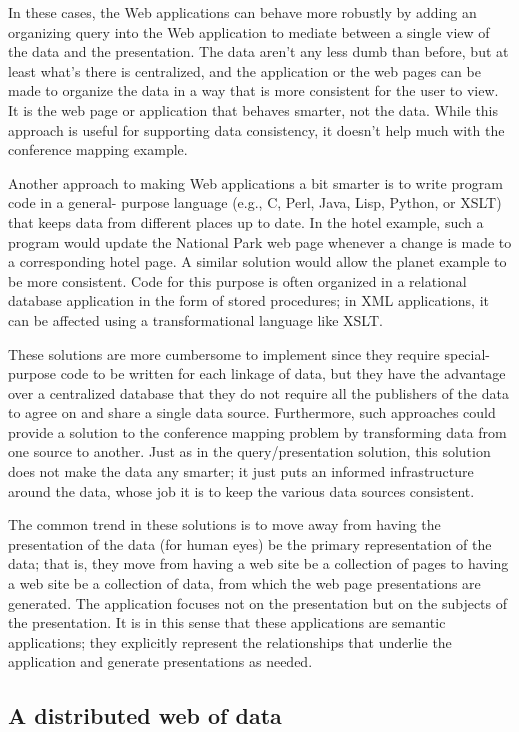 In these cases, the Web applications can behave more robustly by adding
an organizing query into the Web application to mediate between a single
view of the data and the presentation. The data aren't any less dumb
than before, but at least what's there is centralized, and the
application or the web pages can be made to organize the data in a way
that is more consistent for the user to view. It is the web page or
application that behaves smarter, not the data. While this approach is
useful for supporting data consistency, it doesn't help much with the
conference mapping example.

Another approach to making Web applications a bit smarter is to write
program code in a general- purpose language (e.g., C, Perl, Java, Lisp,
Python, or XSLT) that keeps data from different places up to date. In
the hotel example, such a program would update the National Park web
page whenever a change is made to a corresponding hotel page. A similar
solution would allow the planet example to be more consistent. Code for
this purpose is often organized in a relational database application in
the form of stored procedures; in XML applications, it can be affected
using a transformational language like XSLT.

These solutions are more cumbersome to implement since they require
special-purpose code to be written for each linkage of data, but they
have the advantage over a centralized database that they do not require
all the publishers of the data to agree on and share a single data
source. Furthermore, such approaches could provide a solution to the
conference mapping problem by transforming data from one source to
another. Just as in the query/presentation solution, this solution does
not make the data any smarter; it just puts an informed infrastructure
around the data, whose job it is to keep the various data sources
consistent.

The common trend in these solutions is to move away from having the
presentation of the data (for human eyes) be the primary representation
of the data; that is, they move from having a web site be a collection
of pages to having a web site be a collection of data, from which the
web page presentations are generated. The application focuses not on the
presentation but on the subjects of the presentation. It is in this
sense that these applications are semantic applications; they explicitly
represent the relationships that underlie the application and generate
presentations as needed.

\subsection{A distributed web of data}

